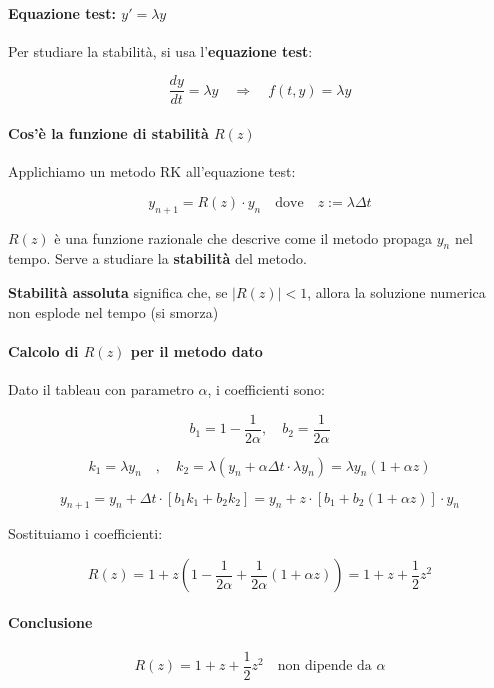 \documentclass[12pt,a4paper]{article}
\begin{document}
\paragraph{Equazione test: \( y' = \lambda y \)}

Per studiare la stabilità, si usa l’\textbf{equazione test}:

\[
\frac{dy}{dt} = \lambda y
\quad \Rightarrow \quad f(t, y) = \lambda y
\]

\paragraph{Cos'è la funzione di stabilità \( R(z) \)}

Applichiamo un metodo RK all’equazione test:

\[
y_{n+1} = R(z) \cdot y_n
\quad \text{dove} \quad z := \lambda \Delta t
\]

\( R(z) \) è una funzione razionale che descrive come il metodo propaga \( y_n \) nel tempo. Serve a studiare la \textbf{stabilità} del metodo.

\textbf{Stabilità assoluta} significa che, se \( |R(z)| < 1 \), allora la soluzione numerica non esplode nel tempo (si smorza)

\paragraph{Calcolo di \( R(z) \) per il metodo dato}

Dato il tableau con parametro \( \alpha \), i coefficienti sono:

\[
b_1 = 1 - \frac{1}{2\alpha}, \quad b_2 = \frac{1}{2\alpha}
\]

\[
k_1 = \lambda y_n
\quad,\quad
k_2 = \lambda \left( y_n + \alpha \Delta t \cdot \lambda y_n \right)
= \lambda y_n (1 + \alpha z)
\]

\[
y_{n+1} = y_n + \Delta t \cdot \left[
b_1 k_1 + b_2 k_2
\right]
= y_n + z \cdot \left[
b_1 + b_2(1 + \alpha z)
\right] \cdot y_n
\]

Sostituiamo i coefficienti:

\[
R(z) = 1 + z \left( 1 - \frac{1}{2\alpha} + \frac{1}{2\alpha} (1 + \alpha z) \right)
= 1 + z + \frac{1}{2} z^2
\]

\paragraph{Conclusione}

\[
\boxed{
R(z) = 1 + z + \frac{1}{2}z^2
\quad \text{non dipende da } \alpha
}
\]
\end{document}
